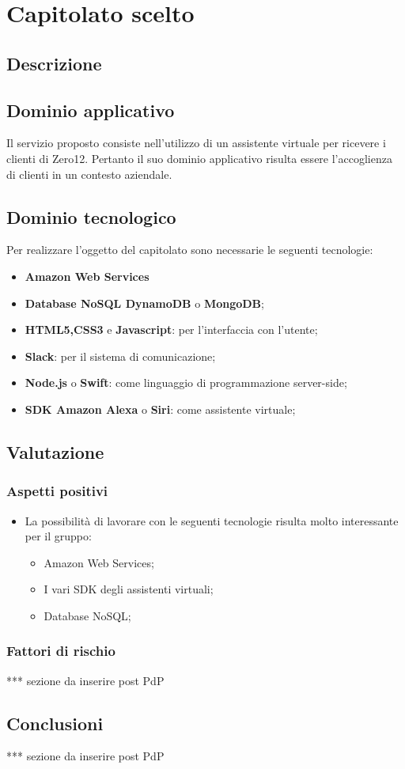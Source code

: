 \section {Capitolato scelto}
	\subsection {Descrizione}
		\SCOPO
	\subsection {Dominio applicativo}
Il servizio proposto consiste nell'utilizzo di un assistente virtuale per ricevere i clienti di Zero12. Pertanto il suo dominio applicativo risulta essere l'accoglienza di clienti in un contesto aziendale.
	\subsection {Dominio tecnologico}
		Per realizzare l'oggetto del capitolato sono necessarie le seguenti tecnologie:
		\begin {itemize}
			\item \textbf{Amazon Web Services}
			\item \textbf{Database NoSQL DynamoDB} o \textbf{MongoDB};
			\item \textbf{HTML5,CSS3} e \textbf{Javascript}: per l'interfaccia con l'utente;
			\item \textbf{Slack}: per il sistema di comunicazione;
			\item \textbf{Node.js} o \textbf{Swift}: come linguaggio di programmazione
 server-side;
 			\item \textbf{SDK Amazon Alexa} o \textbf{Siri}: come assistente virtuale;

		\end {itemize}
	\subsection {Valutazione}
		\subsubsection {Aspetti positivi}
			\begin {itemize}
				\item La possibilità di lavorare con le seguenti tecnologie risulta molto interessante per il gruppo:
				 \begin {itemize}
				 	\item Amazon Web Services;
				 	\item I vari SDK degli assistenti virtuali;
				 	\item Database NoSQL;
				 \end {itemize}
			\end {itemize}
		\subsubsection {Fattori di rischio}
	*** sezione da inserire post PdP
	\subsection {Conclusioni}
	*** sezione da inserire post PdP